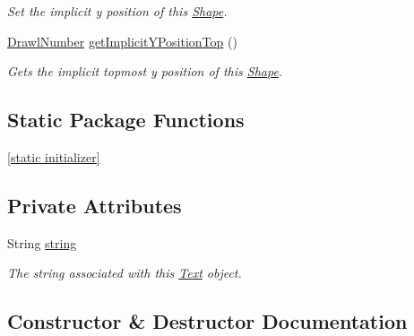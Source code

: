 \begin{DoxyCompactItemize}
\begin{DoxyCompactList}\small\item\em Set the implicit y position of this \hyperlink{classcom_1_1aarrelaakso_1_1drawl_1_1_shape}{Shape}. \end{DoxyCompactList}\item 
\hyperlink{classcom_1_1aarrelaakso_1_1drawl_1_1_drawl_number}{Drawl\+Number} \hyperlink{classcom_1_1aarrelaakso_1_1drawl_1_1_shape_afb64d51ac2023ad770bbc8f37061d5b0}{get\+Implicit\+Y\+Position\+Top} ()
\begin{DoxyCompactList}\small\item\em Gets the implicit topmost y position of this \hyperlink{classcom_1_1aarrelaakso_1_1drawl_1_1_shape}{Shape}. \end{DoxyCompactList}\end{DoxyCompactItemize}
\subsection*{Static Package Functions}
\begin{DoxyCompactItemize}
\item 
\hyperlink{classcom_1_1aarrelaakso_1_1drawl_1_1_shape_ad2adcb85374cf5d6d59429628314e8d1}{\mbox{[}static initializer\mbox{]}}
\end{DoxyCompactItemize}
\subsection*{Private Attributes}
\begin{DoxyCompactItemize}
\item 
String \hyperlink{classcom_1_1aarrelaakso_1_1drawl_1_1_text_a94bf15b06c72349f5d5a1bfc56496685}{string}
\begin{DoxyCompactList}\small\item\em The string associated with this \hyperlink{classcom_1_1aarrelaakso_1_1drawl_1_1_text}{Text} object. \end{DoxyCompactList}\end{DoxyCompactItemize}


\subsection{Constructor \& Destructor Documentation}
\mbox{\label{classcom_1_1aarrelaakso_1_1drawl_1_1_text_a9d9bdd3df91ff551c7bf96f741cde0e9}} 
